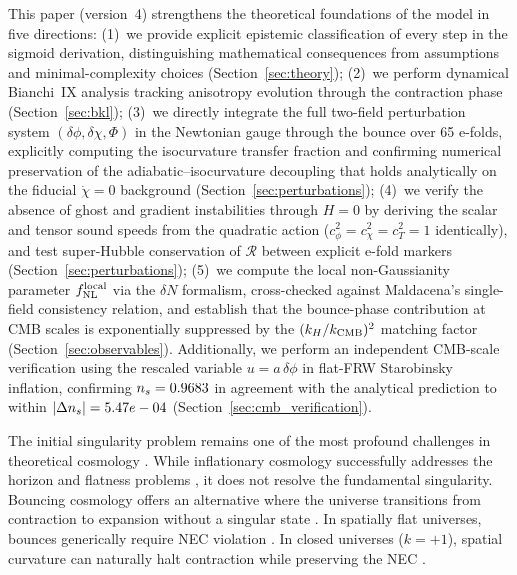 \documentclass[11pt,a4paper]{article}
\begin{document}
This paper (version~4) strengthens the theoretical foundations of the model in five directions: (1)~we provide explicit epistemic classification of every step in the sigmoid derivation, distinguishing mathematical consequences from assumptions and minimal-complexity choices (Section~\ref{sec:theory}); (2)~we perform dynamical Bianchi~IX analysis tracking anisotropy evolution through the contraction phase (Section~\ref{sec:bkl}); (3)~we directly integrate the full two-field perturbation system $(\delta\phi, \delta\chi, \Phi)$ in the Newtonian gauge through the bounce over 65 e-folds, explicitly computing the isocurvature transfer fraction and confirming numerical preservation of the adiabatic--isocurvature decoupling that holds analytically on the fiducial $\dot\chi = 0$ background (Section~\ref{sec:perturbations}); (4)~we verify the absence of ghost and gradient instabilities through $H=0$ by deriving the scalar and tensor sound speeds from the quadratic action ($c_\phi^2 = c_\chi^2 = c_T^2 = 1$ identically), and test super-Hubble conservation of $\mathcal{R}$ between explicit e-fold markers (Section~\ref{sec:perturbations}); (5)~we compute the local non-Gaussianity parameter $f_{\rm NL}^{\rm local}$ via the $\delta N$ formalism, cross-checked against Maldacena's single-field consistency relation, and establish that the bounce-phase contribution at CMB scales is exponentially suppressed by the $(k_H/k_{\rm CMB})^2$ matching factor (Section~\ref{sec:observables}). Additionally, we perform an independent CMB-scale verification using the rescaled variable $u = a\,\delta\phi$ in flat-FRW Starobinsky inflation, confirming $n_s = 0.9683$ in agreement with the analytical prediction to within $|\Delta n_s| = 5.47e-04$ (Section~\ref{sec:cmb_verification}).

The initial singularity problem remains one of the most profound challenges in theoretical cosmology \cite{Hawking1970}. While inflationary cosmology successfully addresses the horizon and flatness problems \cite{Guth1981,Starobinsky1980}, it does not resolve the fundamental singularity. Bouncing cosmology offers an alternative where the universe transitions from contraction to expansion without a singular state \cite{Novello2008}. In spatially flat universes, bounces generically require NEC violation \cite{Cai2012}. In closed universes ($k=+1$), spatial curvature can naturally halt contraction while preserving the NEC \cite{Tolman1934,Ellis2004}.
\end{document}
